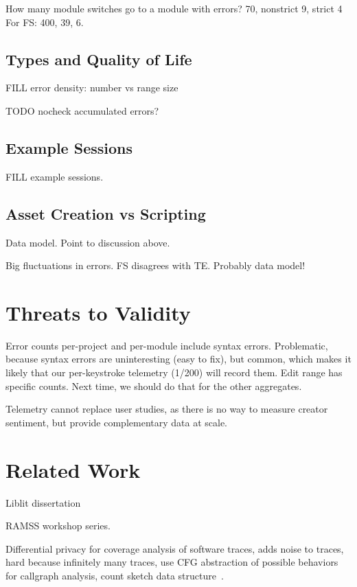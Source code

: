 \documentclass[english,submission,cleveref]{programming}
\begin{document}
How many module switches go to a module with errors?
\mnocheck{} 70, nonstrict 9, strict 4
For FS: \mnocheck{} 400, \mnonstrict{} 39, \mstrict{} 6.


\subsection{Types and Quality of Life}

FILL error density: number vs range size

TODO nocheck accumulated errors?


\subsection{Example Sessions}

FILL example sessions.


\subsection{Asset Creation vs Scripting}

Data model. Point to discussion above.

Big fluctuations in errors.
FS disagrees with TE.
Probably data model!


\section{Threats to Validity}
\label{s:threats}

Error counts per-project and per-module include syntax errors.
Problematic, because syntax errors are uninteresting (easy to fix),
but common, which makes it likely that our per-keystroke telemetry (1/200) will record them.
Edit range has specific counts.
Next time, we should do that for the other aggregates.

Telemetry cannot replace user studies, as there is no way to measure
creator sentiment, but provide complementary data at scale.


\section{Related Work}
\label{s:related}

Liblit dissertation~\cite{liblit-thesis}

RAMSS workshop series.

Differential privacy for coverage analysis of software traces,
adds noise to traces,
hard because infinitely many traces,
use CFG abstraction of possible behaviors for callgraph analysis,
count sketch data structure~\cite{hlzbr-ecoop-2021}.
\end{document}
